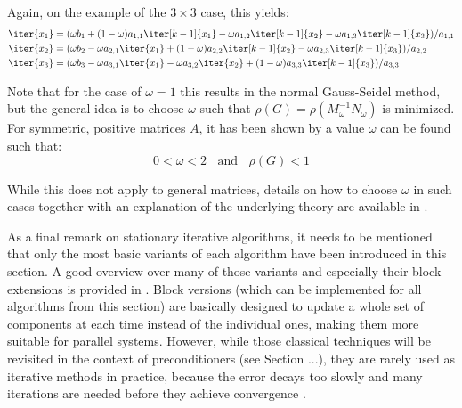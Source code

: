 \noindent Again, on the example of the $3 \times 3$ case, this yields:
\begin{equation}
\label{eqn:sor}
   \begin{aligned}
    \iter{x_1} & =  (\omega b_1 +(1-\omega)a_{1,1}\iter[k-1]{x_1} -\omega a_{1,2}\iter[k-1]{x_2} - \omega a_{1,3}\iter[k-1]{x_3})/a_{1,1} \\
    \iter{x_2} & =  (\omega b_2 -\omega a_{2,1}\iter{x_1} +(1-\omega) a_{2,2}\iter[k-1]{x_2} - \omega a_{2,3}\iter[k-1]{x_3})/a_{2,2} \\
    \iter{x_3} & =  (\omega b_3 -\omega a_{3,1}\iter{x_1} -\omega a_{3,2}\iter{x_2} + (1-\omega) a_{3,3}\iter[k-1]{x_3})/a_{3,3} \\
\end{aligned} 
\end{equation}

\noindent Note that for the case of $\omega = 1$ this results in the normal Gauss-Seidel method, but the general idea is to choose $\omega$ such that $\rho(G)=\rho(M^{-1}_\omega N_\omega)$ is minimized. For symmetric, positive matrices $A$, it has been shown by \cite{young_convergence_1970} a value $\omega$ can be found such that:
\begin{equation}
       0<\omega<2 \;\;\text{ and }\;\; \rho(G)<1
\end{equation}

\noindent While this does not apply to general matrices, details on how to choose $\omega$ in such cases together with an explanation of the underlying theory are available in \cite{greenbaum_iterative_1997}.

As a final remark on stationary iterative algorithms, it needs to be mentioned that only the most basic variants of each algorithm have been introduced in this section. A good overview over many of those variants and especially their block extensions is provided in \cite{saad_iterative_2003}. Block versions (which can be implemented for all algorithms from this section) are basically designed to update a whole set of components at each time instead of the individual ones, making them more suitable for parallel systems. However, while those classical techniques will be revisited in the context of preconditioners (see Section ...), they are rarely used as iterative methods in practice, because the error decays too slowly and many iterations are needed before they achieve convergence \cite{strang_introduction_2009}.




